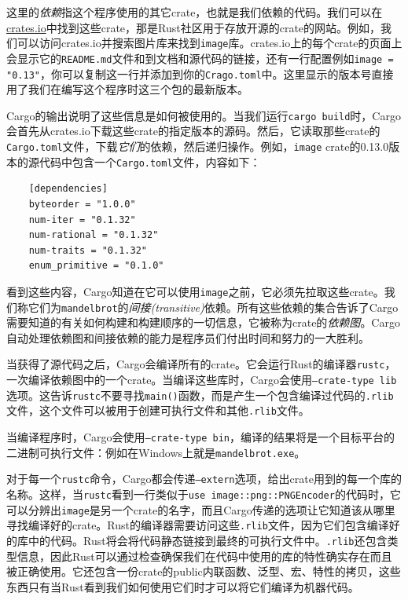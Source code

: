 这里的\emph{依赖}指这个程序使用的其它crate，也就是我们依赖的代码。我们可以在\href{https://crates.io}{crates.io}中找到这些crate，那是Rust社区用于存放开源的crate的网站。例如，我们可以访问crates.io并搜索图片库来找到\texttt{image}库。crates.io上的每个crate的页面上会显示它的\texttt{README.md}文件和到文档和源代码的链接，还有一行配置例如\texttt{image = "0.13"}，你可以复制这一行并添加到你的\texttt{Crago.toml}中。这里显示的版本号直接用了我们在编写这个程序时这三个包的最新版本。

Cargo的输出说明了这些信息是如何被使用的。当我们运行\texttt{cargo build}时，Cargo会首先从crates.io下载这些crate的指定版本的源码。然后，它读取那些crate的\texttt{Cargo.toml}文件，下载\emph{它们}的依赖，然后递归操作。例如，\texttt{image} crate的0.13.0版本的源代码中包含一个\texttt{Cargo.toml}文件，内容如下：
\begin{verbatim}
    [dependencies]
    byteorder = "1.0.0"
    num-iter = "0.1.32"
    num-rational = "0.1.32"
    num-traits = "0.1.32"
    enum_primitive = "0.1.0"
\end{verbatim}

看到这些内容，Cargo知道在它可以使用\texttt{image}之前，它必须先拉取这些crate。我们称它们为\texttt{mandelbrot}的\emph{间接(transitive)}依赖。所有这些依赖的集合告诉了Cargo需要知道的有关如何构建和构建顺序的一切信息，它被称为crate的\emph{依赖图}。Cargo自动处理依赖图和间接依赖的能力是程序员们付出时间和努力的一大胜利。

当获得了源代码之后，Cargo会编译所有的crate。它会运行Rust的编译器\texttt{rustc}，一次编译依赖图中的一个crate。当编译这些库时，Cargo会使用\texttt{--crate-type lib}选项。这告诉\texttt{rustc}不要寻找\texttt{main()}函数，而是产生一个包含编译过代码的\texttt{.rlib}文件，这个文件可以被用于创建可执行文件和其他\texttt{.rlib}文件。

当编译程序时，Cargo会使用\texttt{--crate-type bin}，编译的结果将是一个目标平台的二进制可执行文件：例如在Windows上就是\texttt{mandelbrot.exe}。

对于每一个\texttt{rustc}命令，Cargo都会传递\texttt{--extern}选项，给出crate用到的每一个库的名称。这样，当\texttt{rustc}看到一行类似于\texttt{use image::png::PNGEncoder}的代码时，它可以分辨出\texttt{image}是另一个crate的名字，而且Cargo传递的选项让它知道该从哪里寻找编译好的crate。Rust的编译器需要访问这些\texttt{.rlib}文件，因为它们包含编译好的库中的代码。Rust将会将代码静态链接到最终的可执行文件中。\texttt{.rlib}还包含类型信息，因此Rust可以通过检查确保我们在代码中使用的库的特性确实存在而且被正确使用。它还包含一份crate的public内联函数、泛型、宏、特性的拷贝，这些东西只有当Rust看到我们如何使用它们时才可以将它们编译为机器代码。

